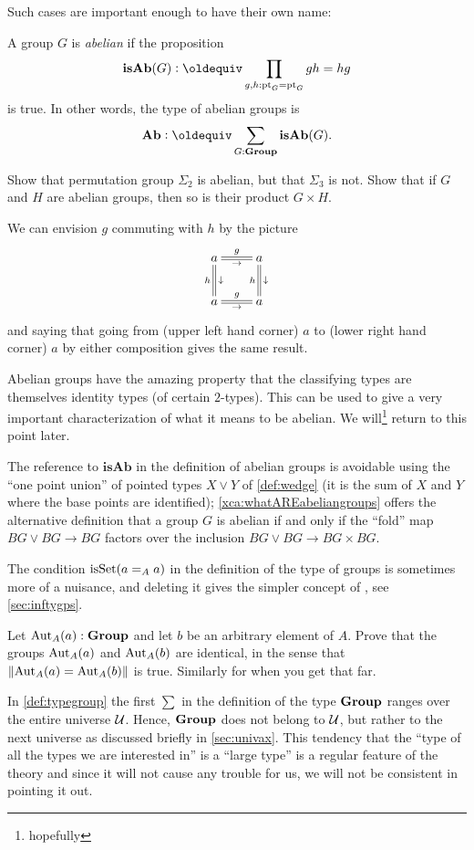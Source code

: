  Such cases are important enough to have their own name:
\begin{definition}\label{def:abgp}
  A group $G$ is \emph{abelian} if %
the proposition
$$\mathbf{isAb}(G)\defequi\prod_{g,h:\pt_G=\pt_G}gh=hg$$
is true.  In other words, the type of abelian groups is 
$$\mathbf{Ab}\defequi \sum_{G:\typegroup}\mathbf{isAb}(G).$$
\end{definition}
\begin{xca}\label{exer:first examples}
  Show that permutation group $\Sigma_2$ is abelian, but that $\Sigma_3$ is not.  Show that if $G$ and $H$ are abelian groups, then so is their product $G\times H$.
\end{xca}
We can envision $g$ commuting with $h$ by the picture
$$\xymatrix{a\ar@{=}[r]^g_\to\ar@{=}[d]^\downarrow_h&a\ar@{=}[d]^\downarrow_h\\
a\ar@{=}[r]^g_\to&a}$$
and saying that going from (upper left hand corner) $a$ to (lower right hand corner) $a$ by either composition gives the same result.

Abelian groups have the amazing property that the classifying types are themselves identity types (of certain $2$-types).  This can be used to give a very important characterization of what it means to be abelian.  We will\footnote{hopefully} return to this point later.
\begin{remark}
  \label{rem:whatAREabeliangroups}
  The reference to $\mathbf{isAb}$ in the definition of abelian groups is avoidable using the ``one point union'' of pointed types $X\vee Y$ of \cref{def:wedge} (it is the sum of $X$ and $Y$ where the base points are identified); \cref{xca:whatAREabeliangroups} offers the alternative definition that a group $G$ is abelian if and only if the ``fold'' map $BG\vee BG\to BG$ factors over the inclusion $BG\vee BG\to BG\times BG$.
\end{remark}
\begin{remark}
  The condition $\mathrm{isSet}(a=_Aa)$ in the definition of the type of groups is sometimes more of a nuisance, and deleting it gives the simpler concept of \aninftygp, see \cref{sec:inftygps}.
\end{remark}
\begin{xca}
   Let $\mathrm{Aut}_A(a):\mathbf{Group}$ and let $b$ be an arbitrary element of $A$.  Prove that the groups $\mathrm{Aut}_A(a)$ and $\mathrm{Aut}_A(b)$ are identical, in the sense that $\lVert\mathrm{Aut}_A(a)=\mathrm{Aut}_A(b)\rVert$ is true.  Similarly for \inftygps when you get that far.
\end{xca}
\begin{remark}\label{rem:monoidandabsgplarge}
 In \cref{def:typegroup} the first $\sum$ in the definition of the type $\mathbf{Group}$ ranges over the entire universe ${\mathcal{U}}$.  Hence, $\mathbf{Group}$ does not belong to ${\mathcal{U}}$, but rather to the next universe as discussed briefly in \cref{sec:univax}.   This tendency that the ``type of all the types we are interested in'' is a ``large type'' is a regular feature of the theory and since it will not cause any trouble for us, we will not be consistent in pointing it out.
  \end{remark}

